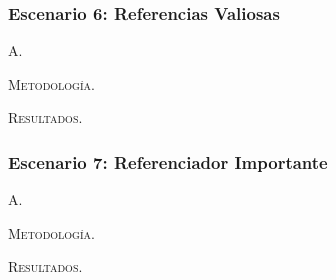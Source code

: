 \vspace{2em}
\subsubsection{Escenario 6: Referencias Valiosas} A.

\vspace{1em}
\noindent \textsc{Metodología}.  

\vspace{1em}
\noindent \textsc{Resultados}.




\vspace{2em}
\subsubsection{Escenario 7: Referenciador Importante} A.

\vspace{1em}
\noindent \textsc{Metodología}.  

\vspace{1em}
\noindent \textsc{Resultados}.

